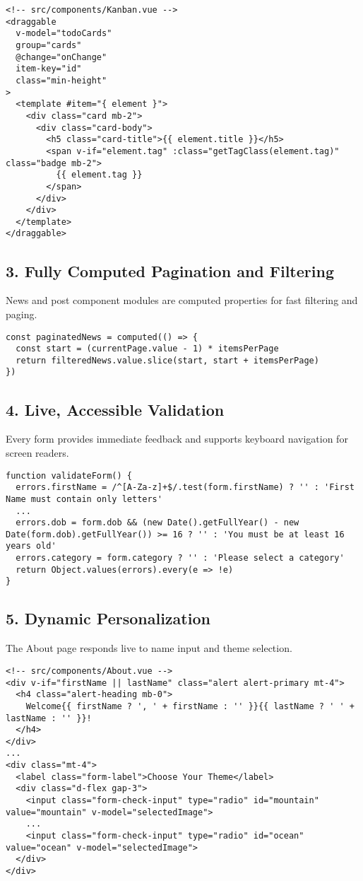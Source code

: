 \documentclass[11pt,a4paper]{article}
\begin{document}
\begin{verbatim}
<!-- src/components/Kanban.vue -->
<draggable 
  v-model="todoCards" 
  group="cards"
  @change="onChange"
  item-key="id"
  class="min-height"
>
  <template #item="{ element }">
    <div class="card mb-2">
      <div class="card-body">
        <h5 class="card-title">{{ element.title }}</h5>
        <span v-if="element.tag" :class="getTagClass(element.tag)" class="badge mb-2">
          {{ element.tag }}
        </span>
      </div>
    </div>
  </template>
</draggable>
\end{verbatim}

\subsection*{3. Fully Computed Pagination and Filtering}
News and post component modules are computed properties for fast filtering and paging.

\begin{verbatim}
const paginatedNews = computed(() => {
  const start = (currentPage.value - 1) * itemsPerPage
  return filteredNews.value.slice(start, start + itemsPerPage)
})
\end{verbatim}

\subsection*{4. Live, Accessible Validation}
Every form provides immediate feedback and supports keyboard navigation for screen readers.
\begin{verbatim}
function validateForm() {
  errors.firstName = /^[A-Za-z]+$/.test(form.firstName) ? '' : 'First Name must contain only letters'
  ...
  errors.dob = form.dob && (new Date().getFullYear() - new Date(form.dob).getFullYear()) >= 16 ? '' : 'You must be at least 16 years old'
  errors.category = form.category ? '' : 'Please select a category'
  return Object.values(errors).every(e => !e)
}
\end{verbatim}

\subsection*{5. Dynamic Personalization}
The About page responds live to name input and theme selection.
\begin{verbatim}
<!-- src/components/About.vue -->
<div v-if="firstName || lastName" class="alert alert-primary mt-4">
  <h4 class="alert-heading mb-0">
    Welcome{{ firstName ? ', ' + firstName : '' }}{{ lastName ? ' ' + lastName : '' }}!
  </h4>
</div>
...
<div class="mt-4">
  <label class="form-label">Choose Your Theme</label>
  <div class="d-flex gap-3">
    <input class="form-check-input" type="radio" id="mountain" value="mountain" v-model="selectedImage">
    ...
    <input class="form-check-input" type="radio" id="ocean" value="ocean" v-model="selectedImage">
  </div>
</div>
\end{verbatim}
\end{document}
